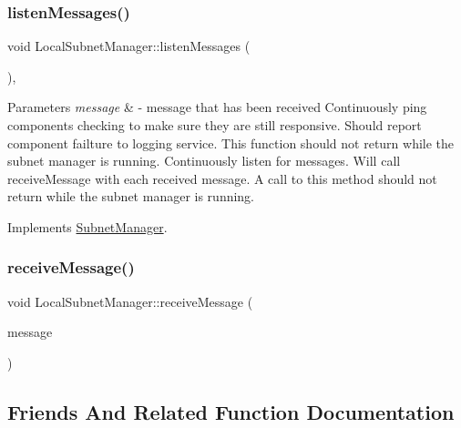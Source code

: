 \subsubsection{\texorpdfstring{listen\+Messages()}{listenMessages()}}
{\footnotesize\ttfamily void Local\+Subnet\+Manager\+::listen\+Messages (\begin{DoxyParamCaption}{ }\end{DoxyParamCaption})\hspace{0.3cm}{\ttfamily [inline]}, {\ttfamily [virtual]}}


\begin{DoxyParams}{Parameters}
{\em message} & -\/ message that has been received Continuously ping components checking to make sure they are still responsive. Should report component failture to logging service. This function should not return while the subnet manager is running. Continuously listen for messages. Will call receive\+Message with each received message. A call to this method should not return while the subnet manager is running. \\
\hline
\end{DoxyParams}


Implements \hyperlink{classSubnetManager_a6aed1acaa5e9f18feb7667904675d119}{Subnet\+Manager}.

\mbox{\label{classLocalSubnetManager_a6eb06d8e5e5c3ae23552e3cde0f4c216}} 
\subsubsection{\texorpdfstring{receive\+Message()}{receiveMessage()}}
{\footnotesize\ttfamily void Local\+Subnet\+Manager\+::receive\+Message (\begin{DoxyParamCaption}\item[{\hyperlink{structSpaMessage}{Spa\+Message} $\ast$}]{message }\end{DoxyParamCaption})\hspace{0.3cm}{\ttfamily [inline]}}



\subsection{Friends And Related Function Documentation}
\mbox{\label{classLocalSubnetManager_a15ed1b4951854aeb9f6bdd54816a16be}} 
